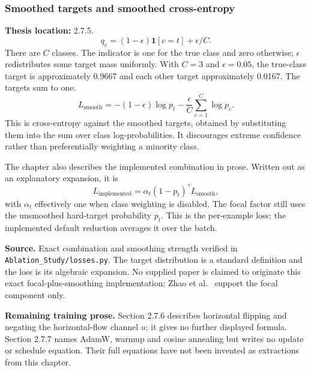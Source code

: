 \documentclass[11pt,a4paper]{article}
\numberwithin{equation}{section}
\begin{document}
\subsubsection{Smoothed targets and smoothed cross-entropy}
\label{fg:smoothing}
\textbf{Thesis location:} 2.7.5.
\begin{equation}
    q_c=(1-\epsilon)\mathbf{1}[c=t]+\epsilon/C.
    \label{fg:eq:smoothing-target}
\end{equation}
There are $C$ classes. The indicator is one for the true class and zero
otherwise; $\epsilon$ redistributes some target mass uniformly. With
$C=3$ and $\epsilon=0.05$, the true-class target is approximately 0.9667 and
each other target approximately 0.0167. The targets sum to one.
\begin{equation}
    L_{\mathrm{smooth}}
      =-(1-\epsilon)\log p_t
        -\frac{\epsilon}{C}\sum_{c=1}^{C}\log p_c.
    \label{fg:eq:smoothing-loss}
\end{equation}
This is cross-entropy against the smoothed targets, obtained by substituting
them into the sum over class log-probabilities. It discourages extreme
confidence rather than preferentially weighting a minority class.

The chapter also describes the implemented combination in prose. Written
out as an explanatory expansion, it is
\begin{equation}
    L_{\mathrm{implemented}}=\alpha_t(1-p_t)^\gamma L_{\mathrm{smooth}},
    \label{fg:eq:combined-loss}
\end{equation}
with $\alpha_t$ effectively one when class weighting is disabled. The focal
factor still uses the unsmoothed hard-target probability $p_t$. This is the
per-example loss; the implemented default reduction averages it over the batch.

\textbf{Source.} Exact combination and smoothing strength verified in
\texttt{Ablation\_Study/losses.py}. The target distribution is a standard
definition and the loss is its algebraic expansion. No supplied paper is
claimed to originate this exact focal-plus-smoothing implementation; Zhao
et al.~\cite{zhaoS2021} support the focal component only.

\textbf{Remaining training prose.} Section 2.7.6 describes horizontal flipping
and negating the horizontal-flow channel $u$; it gives no further displayed
formula. Section 2.7.7 names AdamW, warmup and cosine annealing but writes no
update or schedule equation. Their full equations have not been invented as
extractions from this chapter.
\end{document}
